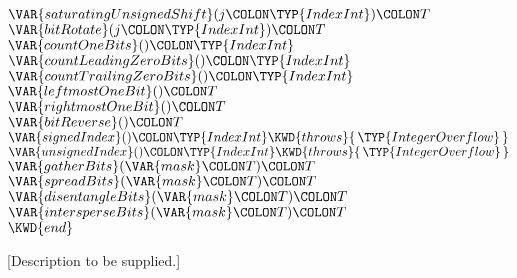 \begin{Fortress}
\(  \VAR{saturatingUnsignedShift}(j\COLON \TYP{IndexInt})\COLON T\)\\
\(  \VAR{bitRotate}(j\COLON \TYP{IndexInt})\COLON T\)\\
\(  \VAR{countOneBits}()\COLON \TYP{IndexInt}\)\\
\(  \VAR{countLeadingZeroBits}()\COLON \TYP{IndexInt}\)\\
\(  \VAR{countTrailingZeroBits}()\COLON \TYP{IndexInt}\)\\
\(  \VAR{leftmostOneBit}()\COLON T\)\\
\(  \VAR{rightmostOneBit}()\COLON T\)\\
\(  \VAR{bitReverse}()\COLON T\)\\
\(  \VAR{signedIndex}()\COLON \TYP{IndexInt} \KWD{throws} \{\,\TYP{IntegerOverflow}\,\}\)\\
\(  \VAR{unsignedIndex}()\COLON \TYP{IndexInt} \KWD{throws} \{\,\TYP{IntegerOverflow}\,\}\)\\
\(  \VAR{gatherBits}(\VAR{mask}\COLON T)\COLON T\)\\
\(  \VAR{spreadBits}(\VAR{mask}\COLON T)\COLON T\)\\
\(  \VAR{disentangleBits}(\VAR{mask}\COLON T)\COLON T\)\\
\(  \VAR{intersperseBits}(\VAR{mask}\COLON T)\COLON T\)\-\\\poptabs
\(\KWD{end}\)
\end{Fortress}



[Description to be supplied.]



